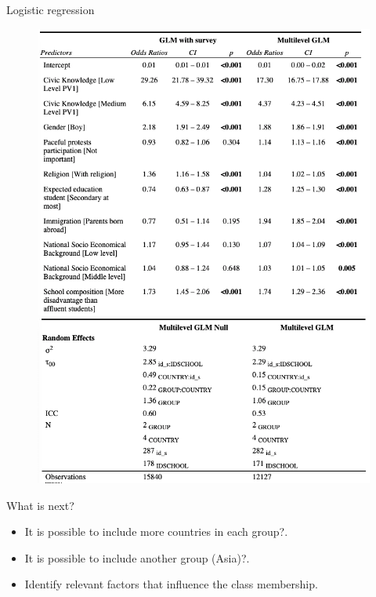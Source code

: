 \documentclass[11pt,t]{beamer}
\begin{document}
\begin{frame}{Logistic regression}
\begin{figure}
	\centering
	\includegraphics[height=0.4\textwidth]{graphics/logmodels.png}
	\includegraphics[height=0.2\textwidth]{graphics/re_hlm.png}\\
\end{figure}
\end{frame} 

\begin{frame}{What is next?}
\begin{itemize}

	\item It is possible to include more countries in each group?.
	\item It is possible to include another group (Asia)?.
	\item Identify relevant factors that influence the class membership.
	
\end{itemize}
\end{frame}
\end{document}
